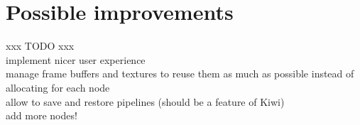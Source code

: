\section{Possible improvements}

xxx TODO xxx\\
implement nicer user experience\\
manage frame buffers and textures to reuse them as much as possible instead of allocating for each node\\
allow to save and restore pipelines (should be a feature of Kiwi)\\
add more nodes!\\
